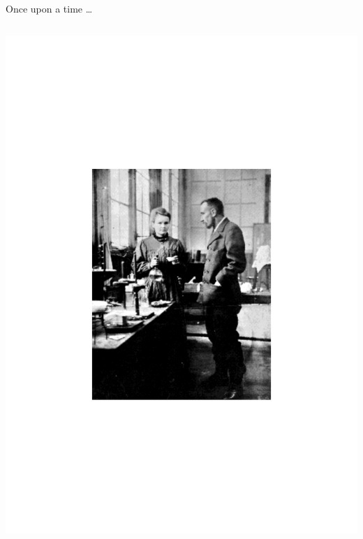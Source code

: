 \begin{frame}{Once upon a time \ldots}
\begin{columns}[T]
    \begin{column}{.3\textwidth}
    \includegraphics[scale=0.25]{figures/20160216_rsw_mariepiere.pdf}
    \end{column}
    

\end{columns}
\end{frame}
